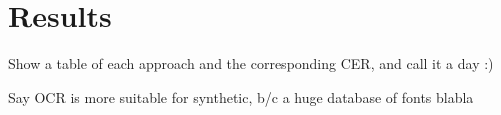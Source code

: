 
\section{Results}\label{sec:transcription_results}

		Show a table of each approach and the corresponding CER, and call it a day :)

	Say OCR is more suitable for synthetic, b/c a huge database of fonts blabla

\stopToDo{}

